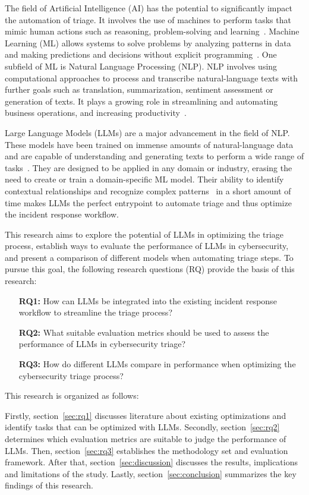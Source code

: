 The field of Artificial Intelligence (AI) has the potential to significantly impact the automation of triage.
It involves the use of machines to perform tasks that mimic human actions such as reasoning, problem-solving and
learning\ \citep{oed:ai}.
Machine Learning (ML) allows systems to solve problems by analyzing patterns in data and making
predictions and decisions without explicit programming\ \citep{oed:ml}.
One subfield of ML is Natural Language Processing (NLP).
NLP involves using computational approaches to process and transcribe natural-language texts with further goals such as
translation, summarization, sentiment assessment or generation of texts.
It plays a growing role in streamlining and automating business operations, and increasing
productivity\ \citep{ibm:nlp}.

Large Language Models (LLMs) are a major advancement in the field of NLP\@.
These models have been trained on immense amounts of natural-language data and are capable of understanding and
generating texts to perform a wide range of tasks\ \citep{ibm:llm}.
They are designed to be applied in any domain or industry, erasing the need to create or train a domain-specific ML
model.
Their ability to identify contextual relationships and recognize complex patterns\ \citep{bordt2024data} in a short
amount of time makes LLMs the perfect entrypoint to automate triage and thus optimize the incident response workflow.

This research aims to explore the potential of LLMs in optimizing the triage process, establish ways to
evaluate the performance of LLMs in cybersecurity, and present a comparison of different models when automating triage
steps.
To pursue this goal, the following research questions (RQ) provide the basis of this research:

\begin{itemize}
    \item[\textbf{RQ1:}] How can LLMs be integrated into the existing incident response workflow to streamline the
    triage process?
    \item[\textbf{RQ2:}] What suitable evaluation metrics should be used to assess the performance of LLMs in
    cybersecurity triage?
    \item[\textbf{RQ3:}] How do different LLMs compare in performance when optimizing the cybersecurity triage process?
\end{itemize}

This research is organized as follows:

Firstly, section\ \ref{sec:rq1} discusses literature about existing optimizations and identify tasks that can
be optimized with LLMs.
Secondly, section\ \ref{sec:rq2} determines which evaluation metrics are suitable to judge the performance of LLMs.
Then, section\ \ref{sec:rq3} establishes the methodology set and evaluation framework.
After that, section\ \ref{sec:discussion} discusses the results, implications and limitations of the study.
Lastly, section\ \ref{sec:conclusion} summarizes the key findings of this research.